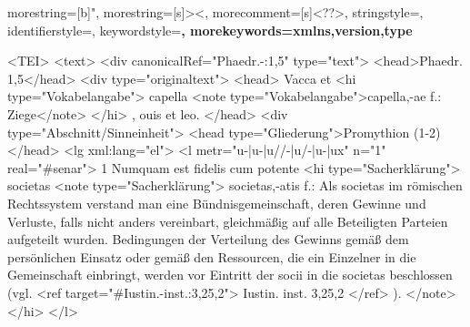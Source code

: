 
\usepackage{listings}
{
  morestring=[b]",
  morestring=[s]{>}{<},
  morecomment=[s]{<?}{?>},
  stringstyle=\color{Text},
  identifierstyle=\color{Element}\upshape,
  keywordstyle=\color{Attr}\bfseries,
  morekeywords={xmlns,version,type}%
}


\begin{lstinputlisting}%
<TEI>
<text>
<div canonicalRef="Phaedr.-:1,5" type="text">
<head>Phaedr. 1,5</head>
<div type="originaltext">
<head>
Vacca et
<hi type="Vokabelangabe">
capella
<note type="Vokabelangabe">capella,-ae f.: Ziege</note>
</hi>
, ouis et leo.
</head>
<div type="Abschnitt/Sinneinheit">
<head type="Gliederung">Promythion (1-2)</head>
<lg xml:lang="el">
<l metr="u-|u-|u//-|u/-|u-|ux" n="1" real="#senar">
1 Numquam est fidelis cum potente
<hi type="Sacherklärung">
societas
<note type="Sacherklärung">
societas,-atis f.: Als societas im römischen Rechtssystem verstand man eine Bündnisgemeinschaft, deren Gewinne und Verluste, falls nicht anders vereinbart, gleichmäßig auf alle Beteiligten Parteien aufgeteilt wurden. Bedingungen der Verteilung des Gewinns gemäß dem persönlichen Einsatz oder gemäß den Ressourcen, die ein Einzelner in die Gemeinschaft einbringt, werden vor Eintritt der socii in die societas beschlossen (vgl.
<ref target="#Iustin.-inst.:3,25,2">
Iustin. inst. 3,25,2
</ref>
).
</note>
</hi>
</l>
\end{lstinputlisting}